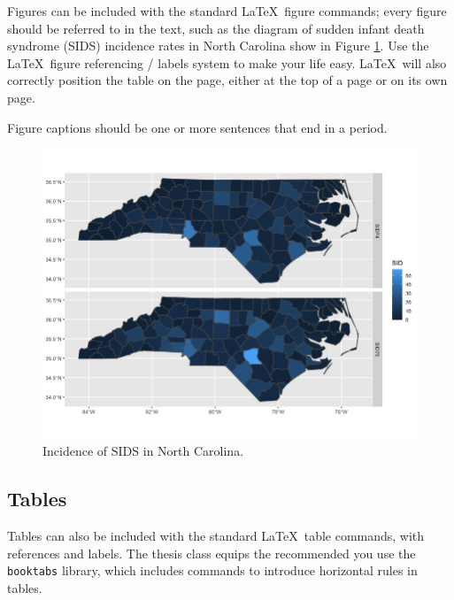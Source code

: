 Figures
can be included with the standard \LaTeX \ figure commands; every figure should
be referred to in the text, such as the diagram of sudden infant death
syndrome (SIDS) incidence rates in North Carolina show in Figure \ref{fig:ncplot}.
Use the \LaTeX \ figure referencing / labels system to make your life easy.
\LaTeX \ will also correctly position the table on the page, either at the
top of a page or on its own page.

Figure captions should be one or more sentences that end in a period.

\begin{figure}
  \includegraphics[width=\textwidth]{./images/ncplot}
  \caption{\label{fig:ncplot} Incidence of SIDS in North Carolina.}
\end{figure}

\lipsum[2]

\subsection{Tables}

Tables can also be included with the standard \LaTeX \ table commands, with
references and labels. The thesis class equips the recommended you use the
\texttt{booktabs} library, which includes commands to introduce horizontal
rules in tables.

